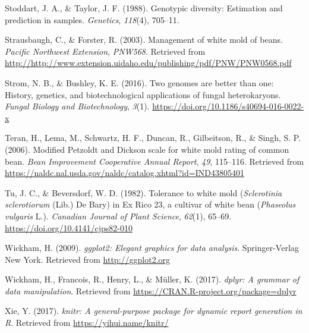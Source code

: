 \documentclass[fleqn,10pt,lineno]{wlpeerj} %
\theoremstyle{definition}
\theoremstyle{definition}
\theoremstyle{definition}
\theoremstyle{remark}
\begin{document}
\hypertarget{ref-stoddart1988genotypic}{}
Stoddart, J. A., \& Taylor, J. F. (1988). Genotypic diversity:
Estimation and prediction in samples. \emph{Genetics}, \emph{118}(4),
705--11.

\hypertarget{ref-strausbaugh2003management}{}
Strausbaugh, C., \& Forster, R. (2003). Management of white mold of
beans. \emph{Pacific Northwest Extension}, \emph{PNW568}. Retrieved from
\url{http://http://www.extension.uidaho.edu/publishing/pdf/PNW/PNW0568.pdf}

\hypertarget{ref-strom2016genomes}{}
Strom, N. B., \& Bushley, K. E. (2016). Two genomes are better than one:
History, genetics, and biotechnological applications of fungal
heterokaryons. \emph{Fungal Biology and Biotechnology}, \emph{3}(1).
\url{https://doi.org/10.1186/s40694-016-0022-x}

\hypertarget{ref-teran2006modified}{}
Teran, H., Lema, M., Schwartz, H. F., Duncan, R., Gilbeitson, R., \&
Singh, S. P. (2006). Modified Petzoldt and Dickson scale for white mold
rating of common bean. \emph{Bean Improvement Cooperative Annual
Report}, \emph{49}, 115--116. Retrieved from
\url{https://naldc.nal.usda.gov/naldc/catalog.xhtml?id=IND43805401}

\hypertarget{ref-tu1982tolerance}{}
Tu, J. C., \& Beversdorf, W. D. (1982). Tolerance to white mold
(\emph{Sclerotinia sclerotiorum} (Lib.) De Bary) in Ex Rico 23, a
cultivar of white bean (\emph{Phaseolus vulgaris} L.). \emph{Canadian
Journal of Plant Science}, \emph{62}(1), 65--69.
\url{https://doi.org/10.4141/cjps82-010}

\hypertarget{ref-ggplot2}{}
Wickham, H. (2009). \emph{ggplot2: Elegant graphics for data analysis}.
Springer-Verlag New York. Retrieved from \url{http://ggplot2.org}

\hypertarget{ref-dplyr}{}
Wickham, H., Francois, R., Henry, L., \& Müller, K. (2017). \emph{dplyr:
A grammar of data manipulation}. Retrieved from
\url{https://CRAN.R-project.org/package=dplyr}

\hypertarget{ref-xie2017knitr}{}
Xie, Y. (2017). \emph{knitr: A general-purpose package for dynamic
report generation in R}. Retrieved from \url{https://yihui.name/knitr/}
\end{document}
